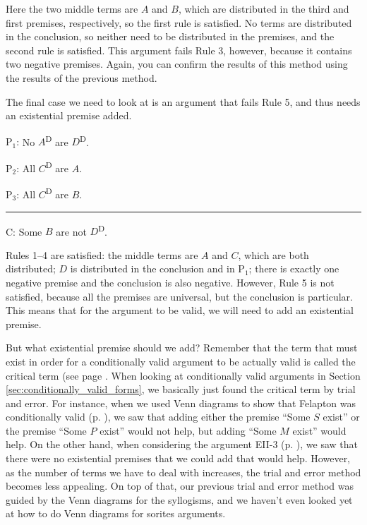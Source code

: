 {Here the two middle terms are $A$ and $B$, which are distributed in the third and first premises, respectively, so the first rule is satisfied. No terms are distributed in the conclusion, so neither need to be distributed in the premises, and the second rule is satisfied. This argument fails Rule 3, however, because it contains two negative premises. Again, you can confirm the results of this method using the results of the previous method. 

The final case we need to look at is an argument that fails Rule 5, and thus needs an existential premise added. 

\begin{earg}
\item[P$_1$:] No $A$\textsuperscript{D} are $D$\textsuperscript{D}. 
\item[P$_2$:] All $C$\textsuperscript{D} are $A$.  %
\item[P$_3$:] All $C$\textsuperscript{D} are $B$. 
\vspace{-.5em}
\item [] \rule{0.3\linewidth}{.5pt} 
\item[C:] Some $B$ are not $D$\textsuperscript{D}. %
\end{earg} 

Rules 1--4 are satisfied: the middle terms are $A$ and $C$, which are both distributed; $D$ is distributed in the conclusion and in P$_1$; there is exactly one negative premise and the conclusion is also negative. However, Rule 5 is not satisfied, because all the premises are universal, but the conclusion is particular. This means that for the argument to be valid, we will need to add an existential premise. 

But what existential premise should we add? Remember that the term that must exist in order for a conditionally valid argument to be actually valid is called the critical term (see page \pageref{def:critical_term}. When looking at conditionally valid arguments in Section \ref{sec:conditionally_valid_forms}, we basically just found the critical term by trial and error. For instance, when we used Venn diagrams to show that Felapton was conditionally valid (p. \pageref{CVFex2}), we saw that adding either the premise ``Some $S$ exist'' or the premise ``Some $P$ exist'' would not help, but adding ``Some $M$ exist'' would help. On the other hand, when considering the argument EII-3 (p. \pageref{CVFex3}), we saw that there were no existential premises that we could add that would help. However, as the number of terms we have to deal with increases, the trial and error method becomes less appealing. On top of that, our previous trial and error method was guided by the Venn diagrams for the syllogisms, and we haven't even looked yet at how to do Venn diagrams for sorites arguments. 


}
